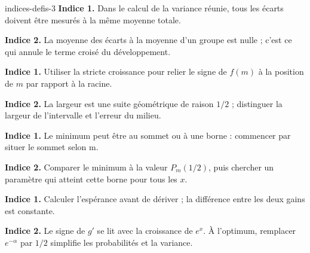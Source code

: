 \begin{blocEdition}{indices-defis-3}
\textbf{Indice 1.} Dans le calcul de la variance réunie, tous les écarts doivent être mesurés à la même moyenne totale.\par\smallskip
\textbf{Indice 2.} La moyenne des écarts à la moyenne d'un groupe est nulle ; c'est ce qui annule le terme croisé du développement.\par\smallskip
{}
\textbf{Indice 1.} Utiliser la stricte croissance pour relier le signe de $f(m)$ à la position de $m$ par rapport à la racine.\par\smallskip
\textbf{Indice 2.} La largeur est une suite géométrique de raison $1/2$ ; distinguer la largeur de l'intervalle et l'erreur du milieu.\par\smallskip
{}
\textbf{Indice 1.} Le minimum peut être au sommet ou à une borne : commencer par situer le sommet selon m.\par\smallskip
\textbf{Indice 2.} Comparer le minimum à la valeur $P_m(1/2)$, puis chercher un paramètre qui atteint cette borne pour tous les $x$.\par\smallskip
{}
\textbf{Indice 1.} Calculer l'espérance avant de dériver ; la différence entre les deux gains est constante.\par\smallskip
\textbf{Indice 2.} Le signe de $g'$ se lit avec la croissance de $e^x$. À l'optimum, remplacer $e^{-\alpha}$ par $1/2$ simplifie les probabilités et la variance.\par\smallskip
\end{blocEdition}


